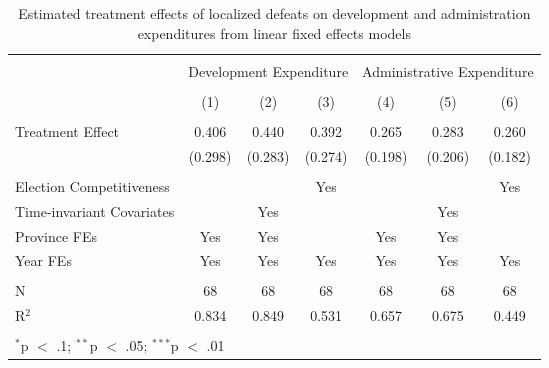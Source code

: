 
\begin{table}[!htbp] \centering 
  \caption{Estimated treatment effects of localized defeats on development and administration expenditures from linear fixed effects models} 
  \label{tab:lfe_mech} 
\begin{tabular}{@{\extracolsep{5pt}}lcccccc} 
\\[-1.8ex]\hline 
\hline \\[-1.8ex] 
 & \multicolumn{3}{c}{Development Expenditure} & \multicolumn{3}{c}{Administrative Expenditure} \\ 
\\[-1.8ex] & (1) & (2) & (3) & (4) & (5) & (6)\\ 
\hline \\[-1.8ex] 
 Treatment Effect & 0.406 & 0.440 & 0.392 & 0.265 & 0.283 & 0.260 \\ 
  & (0.298) & (0.283) & (0.274) & (0.198) & (0.206) & (0.182) \\ 
 \hline \\[-1.8ex] 
Election Competitiveness &  &  & Yes &  &  & Yes \\ 
Time-invariant Covariates &  & Yes &  &  & Yes &  \\ 
Province FEs & Yes & Yes &  & Yes & Yes &  \\ 
Year FEs & Yes & Yes & Yes & Yes & Yes & Yes \\ 
\hline \\[-1.8ex] 
N & 68 & 68 & 68 & 68 & 68 & 68 \\ 
R$^{2}$ & 0.834 & 0.849 & 0.531 & 0.657 & 0.675 & 0.449 \\ 
\hline 
\hline \\[-1.8ex] 
\multicolumn{7}{l}{$^{*}$p $<$ .1; $^{**}$p $<$ .05; $^{***}$p $<$ .01} \\ 
\end{tabular} 
\end{table} 
